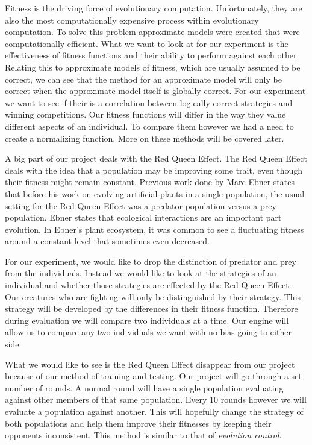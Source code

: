 \documentclass{acm_proc_article-sp}
\begin{document}
Fitness is the driving force of evolutionary computation. Unfortunately, they are also the most computationally expensive process within evolutionary computation. To solve this problem approximate models were created that were computationally efficient\cite{Fitness}. What we want to look at for our experiment is the effectiveness of fitness functions and their ability to perform against each other. Relating this to approximate models of fitness, which are usually assumed to be correct\cite{Fitness}, we can see that the method for an approximate model will only be correct when the approximate model itself is globally correct. For our experiment we want to see if their is a correlation between logically correct strategies and winning competitions. Our fitness functions will differ in the way they value different aspects of an individual. To compare them however we had a need to create a normalizing function. More on these methods will be covered later. 

A big part of our project deals with the Red Queen Effect. The Red Queen Effect deals with the idea that a population may be improving some trait, even though their fitness might remain constant\cite{Ebner}. Previous work done by Marc Ebner\cite{Ebner} states that before his work on evolving artificial plants in a single population, the usual setting for the Red Queen Effect was a predator population versus a prey population\cite{Ebner}\cite{Red}. Ebner states that ecological interactions are an important part evolution. In Ebner's plant ecosystem, it was common to see a fluctuating fitness around a constant level that sometimes even decreased.

For our experiment, we would like to drop the distinction of predator and prey from the individuals. Instead we would like to look at the strategies of an individual and whether those strategies are effected by the Red Queen Effect. Our creatures who are fighting will only be distinguished by their strategy. This strategy will be developed by the differences in their fitness function. Therefore during evaluation we will compare two individuals at a time. Our engine will allow us to compare any two individuals we want with no bias going to either side.

What we would like to see is the Red Queen Effect disappear from our project because of our method of training and testing. Our project will go through a set number of rounds. A normal round will have a single population evaluating against other members of that same population. Every 10 rounds however we will evaluate a population against another. This will hopefully change the strategy of both populations and help them improve their fitnesses by keeping their opponents inconsistent. This method is similar to that of \textit{evolution control}\cite{Fitness}.
\end{document}
